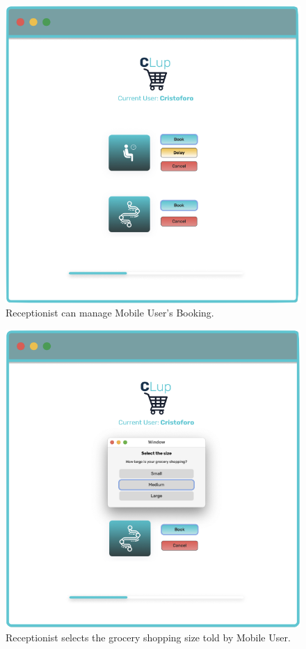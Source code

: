 \begin{figure}[H]
  \caption{Receptionist can manage Mobile User's Booking.}
  \label{fig:Login}
  \centering
  \includegraphics[scale=0.35]{images/mockup/Home_Rec.png}

\end{figure}


\begin{figure}[h]
  \caption{Receptionist selects the grocery shopping size told by Mobile User.}
  \label{fig:Login}
  \centering
  \includegraphics[scale=0.35]{images/mockup/Size_Rec.png}

\end{figure}


